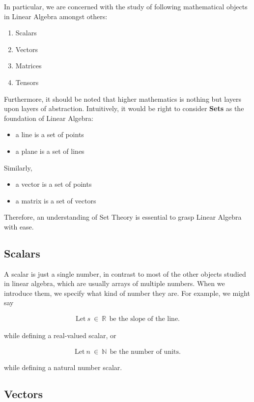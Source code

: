 \documentclass[12pt]{article}
\begin{document}
In particular, we are concerned with the study of following mathematical objects in Linear Algebra amongst others:

\begin{enumerate}
    \item Scalars
    \item Vectors
    \item Matrices
    \item Tensors
\end{enumerate}

Furthermore, it should be noted that higher mathematics is nothing but layers upon layers of abstraction. Intuitively, it would be right to consider \textbf{Sets} as the foundation of Linear Algebra:
\begin{itemize}
    \item a line is a set of points
    \item a plane is a set of lines
\end{itemize}

Similarly,
\begin{itemize}
    \item a vector is a set of points
    \item a matrix is a set of vectors
\end{itemize}

Therefore, an understanding of Set Theory is essential to grasp Linear Algebra with ease.

\subsection{Scalars}

A scalar is just a single number, in contrast to most of the other objects studied in linear algebra, which are usually arrays of multiple numbers. When we introduce them, we specify what kind of number they are. For example, we might say

\begin{align}
\text{Let}\ s\ \in\ \mathbb{R}\ \ \text{be the slope of the line}.
\end{align}

while defining a real-valued scalar, or

\begin{align}
\text{Let}\ n\ \in\ \mathbb{N}\ \ \text{be the number of units}.
\end{align}

while defining a natural number scalar.

\subsection{Vectors}
\end{document}
